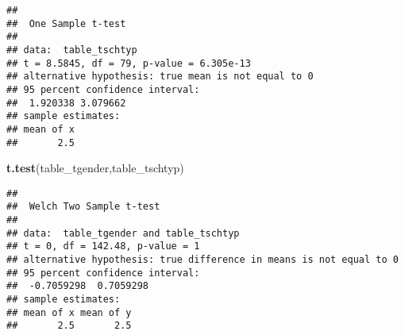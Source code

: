 \documentclass[
]{article}
\newenvironment{Shaded}{\begin{snugshade}}{\end{snugshade}}
\newcommand{\KeywordTok}[1]{\textcolor[rgb]{0.13,0.29,0.53}{\textbf{#1}}}
\newcommand{\NormalTok}[1]{#1}
\begin{document}
\begin{verbatim}
## 
##  One Sample t-test
## 
## data:  table_tschtyp
## t = 8.5845, df = 79, p-value = 6.305e-13
## alternative hypothesis: true mean is not equal to 0
## 95 percent confidence interval:
##  1.920338 3.079662
## sample estimates:
## mean of x 
##       2.5
\end{verbatim}

\begin{Shaded}
\begin{Highlighting}[]
\KeywordTok{t.test}\NormalTok{(table_tgender,table_tschtyp)}
\end{Highlighting}
\end{Shaded}

\begin{verbatim}
## 
##  Welch Two Sample t-test
## 
## data:  table_tgender and table_tschtyp
## t = 0, df = 142.48, p-value = 1
## alternative hypothesis: true difference in means is not equal to 0
## 95 percent confidence interval:
##  -0.7059298  0.7059298
## sample estimates:
## mean of x mean of y 
##       2.5       2.5
\end{verbatim}
\end{document}
